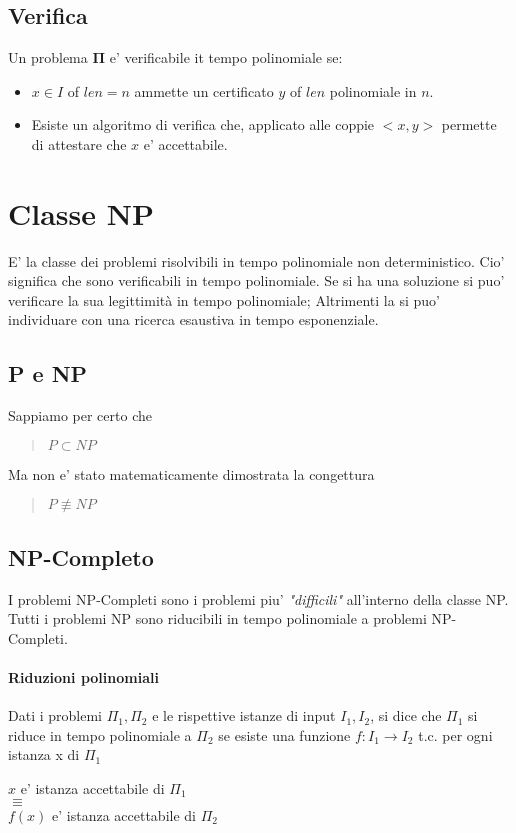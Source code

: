 \subsection{Verifica}
Un problema $\mathbf{\Pi}$ e' verificabile it tempo polinomiale se:
\begin{itemize}
    \item $x \in I$ of $len = n$ ammette un certificato $y$ of $len$ polinomiale in $n$.
    \item Esiste un algoritmo di verifica che, applicato alle coppie $<x,y>$ permette di attestare che $x$ e' accettabile.
\end{itemize}
\section{Classe NP}
E' la classe dei problemi risolvibili in tempo polinomiale non deterministico.
Cio' significa che sono verificabili in tempo polinomiale.
Se si ha una soluzione si puo' verificare la sua legittimità in tempo polinomiale; Altrimenti la si puo' individuare con una ricerca esaustiva in tempo esponenziale.
\subsection{P e NP}
Sappiamo per certo che
\begin{quote}
    $P \subset NP$
\end{quote}
Ma non e' stato matematicamente dimostrata la congettura
\begin{quote}
    $P \not\equiv NP$
\end{quote}
\subsection{NP-Completo}
I problemi NP-Completi sono i problemi piu' \textit{"difficili"} all'interno della classe NP. Tutti i problemi NP sono riducibili in tempo polinomiale a problemi NP-Completi.
\paragraph{Riduzioni polinomiali} Dati i problemi $\Pi_1, \Pi_2$ e le rispettive istanze di input $I_1, I_2$, si dice che $\Pi_1$ si riduce in tempo polinomiale a $\Pi_2$ se esiste una funzione $f: I_1 \rightarrow I_2$ t.c. per ogni istanza x di $\Pi_1$
\begin{center}
    $x$ e' istanza accettabile di $\Pi_1$\\
    $\equiv$\\
    $f(x)$ e' istanza accettabile di $\Pi_2$
\end{center}
